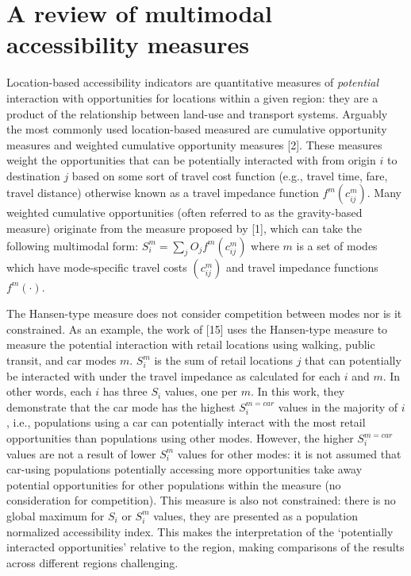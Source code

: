 \documentclass[10pt,letterpaper]{article}
\begin{document}
\hypertarget{a-review-of-multimodal-accessibility-measures}{%
\section{A review of multimodal accessibility
measures}\label{a-review-of-multimodal-accessibility-measures}}

Location-based accessibility indicators are quantitative measures of
\emph{potential} interaction with opportunities for locations within a
given region: they are a product of the relationship between land-use
and transport systems. Arguably the most commonly used location-based
measured are cumulative opportunity measures and weighted cumulative
opportunity measures {[}2{]}. These measures weight the opportunities
that can be potentially interacted with from origin \(i\) to destination
\(j\) based on some sort of travel cost function (e.g., travel time,
fare, travel distance) otherwise known as a travel impedance function
\(f^{m}(c^m_{ij})\). Many weighted cumulative opportunities (often
referred to as the gravity-based measure) originate from the measure
proposed by {[}1{]}, which can take the following multimodal form:
\(S_i^m = \sum_j O_j f^m(c_{ij}^m)\) where \(m\) is a set of modes which
have mode-specific travel costs \((c_{ij}^m)\) and travel impedance
functions \(f^m(\cdot)\).

The Hansen-type measure does not consider competition between modes nor
is it constrained. As an example, the work of {[}15{]} uses the
Hansen-type measure to measure the potential interaction with retail
locations using walking, public transit, and car modes \(m\). \(S_i^m\)
is the sum of retail locations \(j\) that can potentially be interacted
with under the travel impedance as calculated for each \(i\) and \(m\).
In other words, each \(i\) has three \(S_i\) values, one per \(m\). In
this work, they demonstrate that the car mode has the highest
\(S_i^{m=car}\) values in the majority of \(i\), i.e., populations using
a car can potentially interact with the most retail opportunities than
populations using other modes. However, the higher \(S_i^{m=car}\)
values are not a result of lower \(S_i^{m}\) values for other modes: it
is not assumed that car-using populations potentially accessing more
opportunities take away potential opportunities for other populations
within the measure (no consideration for competition). This measure is
also not constrained: there is no global maximum for \(S_i\) or
\(S_i^m\) values, they are presented as a population normalized
accessibility index. This makes the interpretation of the `potentially
interacted opportunities' relative to the region, making comparisons of
the results across different regions challenging.
\end{document}
